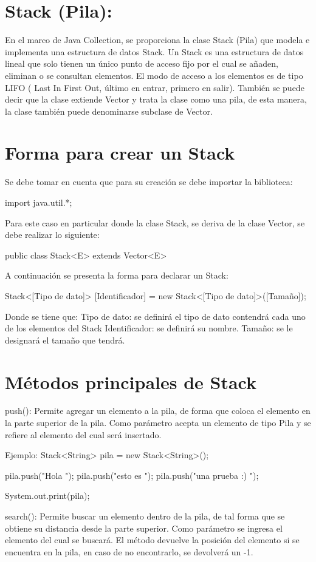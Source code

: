 \documentclass[12pt, letterpaper]{article} %
\begin{document}
\section*{Stack (Pila):}
En el marco de Java Collection, se proporciona la clase Stack (Pila) que modela e implementa una estructura de datos Stack. Un Stack es una estructura de datos lineal que solo tienen un único punto de acceso fijo por el cual se añaden, eliminan o se consultan elementos. El modo de acceso a los elementos es de tipo LIFO ( Last In First Out, último en entrar, primero en salir).
También se puede decir que la clase extiende Vector y trata la clase como una pila, de esta manera, la clase también puede denominarse subclase de Vector.

\section*{Forma para crear un Stack}
Se debe tomar en cuenta que para su creación se debe importar la biblioteca:

import java.util.*;

Para este caso en particular donde la clase Stack, se deriva de la clase Vector, se debe realizar lo siguiente:

public class Stack<E> extends Vector<E>

A continuación se presenta la forma para declarar un Stack:

Stack<[Tipo de dato]> [Identificador] = new Stack<[Tipo de dato]>([Tamaño]);

Donde se tiene que:
Tipo de dato: se definirá el tipo de dato contendrá cada uno de los elementos del Stack
Identificador: se definirá su nombre.
Tamaño: se le designará el tamaño que tendrá.

\section*{Métodos principales de Stack}
push():
Permite agregar un elemento a la pila, de forma que coloca el elemento en la parte superior de la pila. Como parámetro acepta un elemento de tipo Pila y se refiere al elemento del cual será insertado. 

Ejemplo:
Stack<String> pila = new Stack<String>();

pila.push("Hola ");
pila.push("esto es ");
pila.push("una prueba :) ");

System.out.print(pila);


search():
Permite buscar un elemento dentro de la pila, de tal forma que se obtiene su distancia desde la parte superior. Como parámetro se ingresa el elemento del cual se buscará. El método devuelve la posición del elemento si se encuentra en la pila, en caso de no encontrarlo, se devolverá un -1. 
\end{document}
